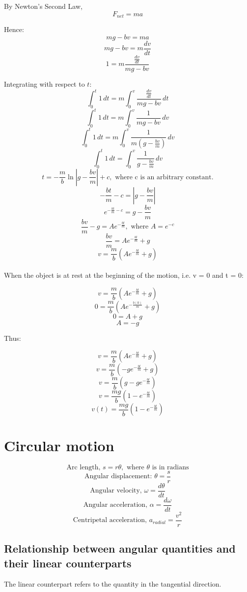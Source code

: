\documentclass[11pt]{article}
\begin{document}
By Newton's Second Law,
\[F_{net} = ma\]

Hence:
\[mg - bv = ma\]
\[mg - bv = m \frac{dv}{dt}\]
\[1 = m \frac{ \frac{dv}{dt} }{mg - bv}\]

\newpage

Integrating with respect to \(t\):
\[\int_0^t 1 \, dt = m \int_0^v \frac{ \frac{dv}{dt} }{mg - bv} \, dt\]
\[\int_0^t 1 \, dt = m \int_0^v \frac{1}{mg - bv} \, dv\]
\[\int_0^t 1 \, dt = m \int_0^v \frac{1}{m(g - \frac{bv}{m})} \, dv\]
\[\int_0^t 1 \, dt = \int_0^v \frac{1}{g - \frac{bv}{m}} \, dv\]
\[t = - \frac{m}{b} \ln \left| g - \frac{bv}{m} \right| + c, \text{ where c is an arbitrary constant.}\]
\[- \frac{bt}{m} - c = \left| g - \frac{bv}{m} \right|\]
\[e^{- \frac{bt}{m} - c} = g - \frac{bv}{m}\]
\[\frac{bv}{m} - g = Ae^{-\frac{bt}{m}}, \text{ where } A = e^{-c}\]
\[\frac{bv}{m} = Ae^{-\frac{bt}{m}} + g\]
\[v = \frac{m}{b} (Ae^{-\frac{bt}{m}} + g)\]
\\[0pt]

When the object is at rest at the beginning of the motion, i.e. v = 0 and t = 0:

\[v = \frac{m}{b} (Ae^{-\frac{bt}{m}} + g)\]
\[0 = \frac{m}{b} (Ae^{-\frac{b(0)}{m}} + g)\]
\[0 = A + g\]
\[A = -g\]

\newpage

Thus:

\[v = \frac{m}{b} (Ae^{-\frac{bt}{m}} + g)\]
\[v = \frac{m}{b} (-ge^{-\frac{bt}{m}} + g)\]
\[v = \frac{m}{b} (g - ge^{-\frac{bt}{m}})\]
\[v = \frac{mg}{b} (1 - e^{-\frac{bt}{m}})\]
\[v(t) = \frac{mg}{b} (1 - e^{-\frac{bt}{m}})\]

\section{Circular motion}
\label{sec:org05cff7b}
\[\text{Arc length, } s = r \theta, \text{ where } \theta \text{ is in radians}\]
\[\text{Angular displacement: } \theta = \frac{s}{r}\]
\[\text{Angular velocity, } \omega = \frac{d \theta}{dt}\]
\[\text{Angular acceleration, } \alpha = \frac{d \omega}{dt}\]
\[\text{Centripetal acceleration, } a_{radial} = \frac{v^2}{r}\]

\subsection{Relationship between angular quantities and their linear counterparts}
\label{sec:org3582b34}
The linear counterpart refers to the quantity in the tangential direction.
\end{document}
